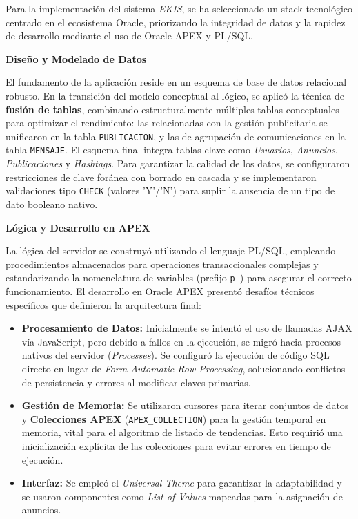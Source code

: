 Para la implementación del sistema \textit{EKIS}, se ha seleccionado un stack tecnológico centrado en el ecosistema Oracle, priorizando la integridad de datos y la rapidez de desarrollo mediante el uso de Oracle APEX y PL/SQL.

\textbf{Diseño y Modelado de Datos}

El fundamento de la aplicación reside en un esquema de base de datos relacional robusto. En la transición del modelo conceptual al lógico, se aplicó la técnica de \textbf{fusión de tablas}, combinando estructuralmente múltiples tablas conceptuales para optimizar el rendimiento: las relacionadas con la gestión publicitaria se unificaron en la tabla \texttt{PUBLICACION}, y las de agrupación de comunicaciones en la tabla \texttt{MENSAJE}. El esquema final integra tablas clave como \textit{Usuarios}, \textit{Anuncios}, \textit{Publicaciones} y \textit{Hashtags}. Para garantizar la calidad de los datos, se configuraron restricciones de clave foránea con borrado en cascada y se implementaron validaciones tipo \texttt{CHECK} (valores 'Y'/'N') para suplir la ausencia de un tipo de dato booleano nativo.

\textbf{Lógica y Desarrollo en APEX}

La lógica del servidor se construyó utilizando el lenguaje PL/SQL, empleando procedimientos almacenados para operaciones transaccionales complejas y estandarizando la nomenclatura de variables (prefijo \texttt{p\_}) para asegurar el correcto funcionamiento. El desarrollo en Oracle APEX presentó desafíos técnicos específicos que definieron la arquitectura final:
\begin{itemize}
    \item \textbf{Procesamiento de Datos:} Inicialmente se intentó el uso de llamadas AJAX vía JavaScript, pero debido a fallos en la ejecución, se migró hacia procesos nativos del servidor (\textit{Processes}). Se configuró la ejecución de código SQL directo en lugar de \textit{Form Automatic Row Processing}, solucionando conflictos de persistencia y errores al modificar claves primarias.
    \item \textbf{Gestión de Memoria:} Se utilizaron cursores para iterar conjuntos de datos y \textbf{Colecciones APEX} (\texttt{APEX\_COLLECTION}) para la gestión temporal en memoria, vital para el algoritmo de listado de tendencias. Esto requirió una inicialización explícita de las colecciones para evitar errores en tiempo de ejecución.
    \item \textbf{Interfaz:} Se empleó el \textit{Universal Theme} para garantizar la adaptabilidad y se usaron componentes como \textit{List of Values} mapeadas para la asignación de anuncios.
\end{itemize}

